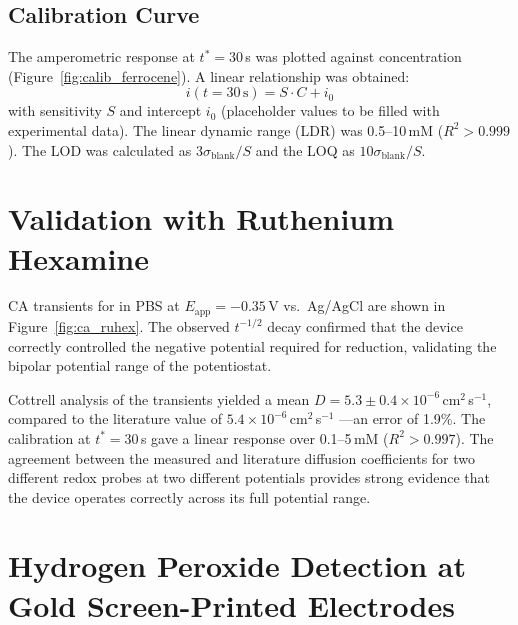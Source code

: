 \subsection{Calibration Curve}

The amperometric response at $t^* = 30$\,s was plotted against concentration (Figure~\ref{fig:calib_ferrocene}). A linear relationship was obtained:
\begin{equation}
    i(t=30\,\text{s}) = S \cdot C + i_0
\end{equation}
with sensitivity $S$ and intercept $i_0$ (placeholder values to be filled with experimental data). The linear dynamic range (LDR) was 0.5--10\,mM ($R^2 > 0.999$). The LOD was calculated as $3\sigma_\text{blank}/S$ and the LOQ as $10\sigma_\text{blank}/S$.


\section{Validation with Ruthenium Hexamine}
\label{sec:ruhex_results}

CA transients for \ruhex{} in PBS at $E_\text{app} = -0.35$\,V vs.\ Ag/AgCl are shown in Figure~\ref{fig:ca_ruhex}. The observed $t^{-1/2}$ decay confirmed that the device correctly controlled the negative potential required for \ruhex{} reduction, validating the bipolar potential range of the potentiostat.


Cottrell analysis of the \ruhex{} transients yielded a mean $D = 5.3 \pm 0.4 \times 10^{-6}$\,cm$^2$\,s$^{-1}$, compared to the literature value of $5.4 \times 10^{-6}$\,cm$^2$\,s$^{-1}$ \cite{McCreery2008}—an error of 1.9\%. The calibration at $t^* = 30$\,s gave a linear response over 0.1--5\,mM ($R^2 > 0.997$). The agreement between the measured and literature diffusion coefficients for two different redox probes at two different potentials provides strong evidence that the device operates correctly across its full potential range.

\section{Hydrogen Peroxide Detection at Gold Screen-Printed Electrodes}
\label{sec:h2o2_results}

